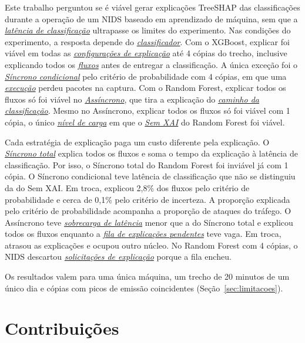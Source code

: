 \documentclass[
  12pt,
  oneside,
  a4paper,
  chapter=TITLE,
  sumario=tradicional,
  english,
  brazil
]{abntex2}
\newcommand{\termo}[2]{\hyperref[gl:#1]{\emph{#2}}}
\begin{document}
Este trabalho perguntou se é viável gerar explicações TreeSHAP das classificações durante a
operação de um NIDS baseado em aprendizado de máquina, sem que a
\termo{latencia-classificacao}{latência de classificação} ultrapasse os limites do experimento. Nas
condições do experimento, a resposta depende do \termo{classificador}{classificador}. Com o XGBoost,
explicar foi viável em todas as \termo{configuracao}{configurações de explicação} até 4 cópias do trecho, inclusive
explicando todos os \termo{fluxo}{fluxos} antes de entregar a classificação. A única exceção foi o
\termo{sincrono-condicional}{Síncrono condicional} pelo critério de probabilidade com 4 cópias, em
que uma \termo{execucao}{execução} perdeu pacotes na captura. Com o Random Forest, explicar todos os
fluxos só foi viável no \termo{assincrono}{Assíncrono}, que tira a explicação do
\termo{caminho}{caminho da classificação}. Mesmo no Assíncrono, explicar todos os fluxos só foi
viável com 1 cópia, o único \termo{nivel-carga}{nível de carga} em que o \termo{sem-xai}{Sem XAI} do
Random Forest foi viável.

Cada estratégia de explicação paga um custo diferente pela explicação. O
\termo{sincrono-total}{Síncrono total} explica todos os fluxos e soma o tempo da explicação à
latência de classificação. Por isso, o Síncrono total do Random Forest foi inviável já com 1 cópia.
O Síncrono condicional teve latência de classificação que não se distinguiu da do Sem XAI. Em
troca, explicou 2,8\% dos fluxos pelo critério de probabilidade e cerca de 0,1\% pelo critério de
incerteza. A proporção explicada pelo critério de probabilidade acompanha a proporção de ataques do
tráfego. O Assíncrono teve \termo{sobrecarga}{sobrecarga de latência} menor que a do Síncrono total
e explicou todos os fluxos enquanto a \termo{fila-explicacoes}{fila de explicações pendentes} teve
vaga. Em troca, atrasou as explicações e ocupou outro núcleo. No Random Forest com 4 cópias, o NIDS
descartou \termo{solicitacao}{solicitações de explicação} porque a fila encheu.

Os resultados valem para uma única máquina, um trecho de 20 minutos de um único dia e cópias com
picos de emissão coincidentes (Seção~\ref{sec:limitacoes}).

\section{Contribuições}
\end{document}
